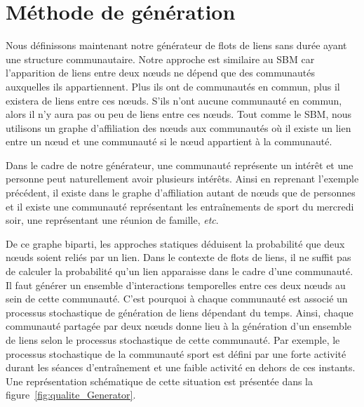 
\section{Méthode de génération}
\label{sec:versqualite_methode}

Nous définissons maintenant notre générateur de flots de liens sans durée ayant une structure communautaire.
Notre approche est similaire au SBM car l'apparition de liens entre deux n\oe{}uds ne dépend que des communautés auxquelles ils appartiennent.
Plus ils ont de communautés en commun, plus il existera de liens entre ces n\oe{}uds.
S'ils n'ont aucune communauté en commun, alors il n'y aura pas ou peu de liens entre ces n\oe{}uds.
Tout comme le SBM, nous utilisons un graphe d'affiliation des n\oe{}uds aux communautés où il existe un lien entre un n\oe{}ud et une communauté si le n\oe{}ud appartient à la communauté.

Dans le cadre de notre générateur, une communauté représente un intérêt et une personne peut naturellement avoir plusieurs intérêts.
Ainsi en reprenant l'exemple précédent, il existe dans le graphe d'affiliation autant de n\oe{}uds que de personnes et il existe une communauté représentant les entraînements de sport du mercredi soir, une représentant une réunion de famille, \emph{etc}.

De ce graphe biparti, les approches statiques déduisent la probabilité que deux n\oe{}uds soient reliés par un lien.
Dans le contexte de flots de liens, il ne suffit pas de calculer la probabilité qu'un lien apparaisse dans le cadre d'une communauté.
Il faut générer un ensemble d'interactions temporelles entre ces deux n\oe{}uds au sein de cette communauté.
C'est pourquoi à chaque communauté est associé un processus stochastique de génération de liens dépendant du temps.
Ainsi, chaque communauté partagée par deux n\oe{}uds donne lieu à la génération d'un ensemble de liens selon le processus stochastique de cette communauté.
Par exemple, le processus stochastique de la communauté sport est défini par une forte activité durant les séances d'entraînement et une faible activité en dehors de ces instants.
Une représentation schématique de cette situation est présentée dans la figure~\ref{fig:qualite_Generator}.



